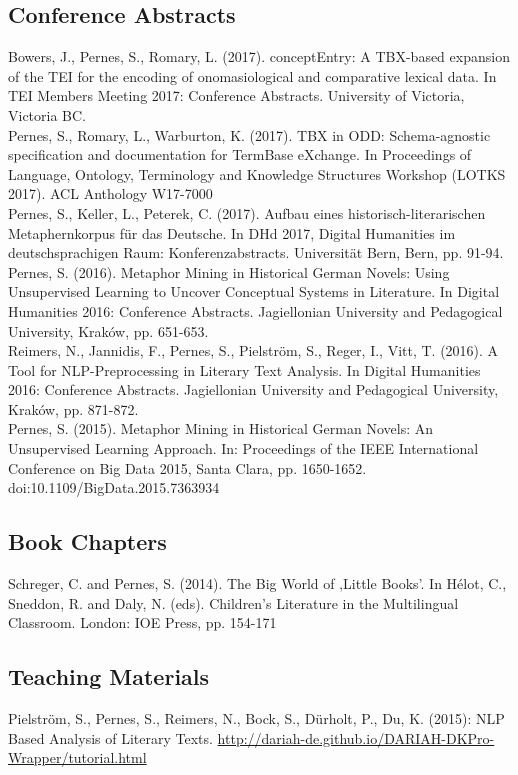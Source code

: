\documentclass[10pt, a4paper]{article}
\newcommand{\years}[1]{\marginnote{\scriptsize #1}}
\begin{document}
\subsection*{Conference Abstracts}
\noindent
\years{2017}Bowers, J., Pernes, S., Romary, L. (2017). conceptEntry: A TBX-based expansion of the TEI for the encoding of onomasiological and comparative lexical data. In TEI Members Meeting 2017: Conference Abstracts. University of Victoria, Victoria BC.\\
\years{2017}Pernes, S., Romary, L., Warburton, K. (2017). TBX in ODD: Schema-agnostic specification and documentation for TermBase eXchange. In Proceedings of Language, Ontology, Terminology and Knowledge Structures Workshop (LOTKS 2017). ACL Anthology W17-7000\\
\years{2017}Pernes, S., Keller, L., Peterek, C. (2017). Aufbau eines historisch-literarischen Metaphernkorpus für das Deutsche. In DHd 2017, Digital Humanities im deutschsprachigen Raum: Konferenzabstracts. Universität Bern, Bern, pp. 91-94.\\
\years{2016}Pernes, S. (2016). Metaphor Mining in Historical German Novels: Using Unsupervised Learning to Uncover Conceptual Systems in Literature. In Digital Humanities 2016: Conference Abstracts. Jagiellonian University and Pedagogical University, Kraków, pp. 651-653.\\
\years{2016}Reimers, N., Jannidis, F., Pernes, S., Pielström, S., Reger, I., Vitt, T. (2016). A Tool for NLP-Preprocessing in Literary Text Analysis. In Digital Humanities 2016: Conference Abstracts. Jagiellonian University and Pedagogical University, Kraków, pp. 871-872.\\
\years{2015}Pernes, S. (2015). Metaphor Mining in Historical German Novels: An Unsupervised Learning Approach. In: Proceedings of the IEEE International Conference on Big Data 2015, Santa Clara, pp. 1650-1652. doi:10.1109/BigData.2015.7363934

\subsection*{Book Chapters}
\noindent
\years{2014}Schreger, C. and Pernes, S. (2014). The Big World of ‚Little Books’. In Hélot, C., Sneddon, R. and Daly, N. (eds). Children's Literature in the Multilingual Classroom. London: IOE Press, pp. 154-171

\subsection*{Teaching Materials}
\noindent
\years{2015}Pielström, S., Pernes, S., Reimers, N., Bock, S., Dürholt, P., Du, K. (2015): NLP Based Analysis of Literary Texts. \href{http://dariah-de.github.io/DARIAH-DKPro-Wrapper/tutorial.html}{http://dariah-de.github.io/DARIAH-DKPro-Wrapper/tutorial.html}
\end{document}
